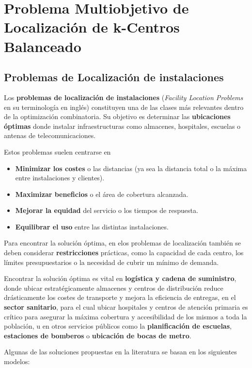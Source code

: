 \documentclass[12pt,a4paper]{book}
\begin{document}
\chapter{Problema Multiobjetivo de Localización de k-Centros Balanceado}

\section{Problemas de Localización de instalaciones}

Los \textbf{problemas de localización de instalaciones} (\textit{Facility Location Problems} en su terminología en inglés) constituyen una de las clases más relevantes dentro de la optimización combinatoria. Su objetivo es determinar las \textbf{ubicaciones óptimas} donde instalar infraestructuras como almacenes, hospitales, escuelas o antenas de telecomunicaciones.

Estos problemas suelen centrarse en
\begin{itemize}
    \item \textbf{Minimizar los costes} o las distancias (ya sea la distancia total o la máxima entre instalaciones y clientes).
    \item \textbf{Maximizar beneficios} o el área de cobertura alcanzada.
    \item \textbf{Mejorar la equidad} del servicio o los tiempos de respuesta.
    \item \textbf{Equilibrar el uso} entre las distintas instalaciones.
\end{itemize}

Para encontrar la solución óptima, en elos problemas de localización también se deben considerar \textbf{restricciones} prácticas, como la capacidad de cada centro, los límites presupuestarios o la necesidad de cubrir un mínimo de demanda.

Encontrar la solución óptima es vital en \textbf{logística y cadena de suministro}, donde ubicar estratégicamente almacenes y centros
de distribución reduce drásticamente los costes de transporte y mejora la eficiencia de entregas, en el \textbf{sector sanitario}, para el cual ubicar hospitales y centros de atención primaria es crítico para
asegurar la máxima cobertura y accesibilidad de los mismos a toda la población, u en otros servicios públicos como la \textbf{planificación de escuelas}, \textbf{estaciones de bomberos} o \textbf{ubicación de bocas de metro}.

Algunas de las soluciones propuestas en la literatura se basan en los siguientes modelos:
\end{document}
